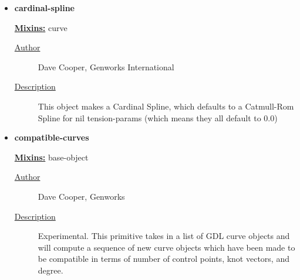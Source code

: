 \documentclass [11pt]{book}
\begin{document}
\begin{itemize}
\begin{description}
\end{description}







\item {}
\label{prim:cardinal-spline}
\textbf{cardinal-spline}


\textbf{
\underline{Mixins:}} curve





\begin{description}

\item [
\underline{Author}]


Dave Cooper, Genworks International



\item [
\underline{Description}]


This object makes a Cardinal Spline, which defaults to a Catmull-Rom Spline for nil tension-params (which means they all default to 0.0)



\end{description}









\item {}
\label{prim:compatible-curves}
\textbf{compatible-curves}


\textbf{
\underline{Mixins:}} base-object





\begin{description}

\item [
\underline{Author}]


Dave Cooper, Genworks



\item [
\underline{Description}]


Experimental. This primitive takes in a list of GDL 
curve objects and will compute a sequence of new curve objects which have been made 
to be compatible in terms of number of control points, knot vectors, and degree.



\end{description}





\end{itemize}
\end{document}
